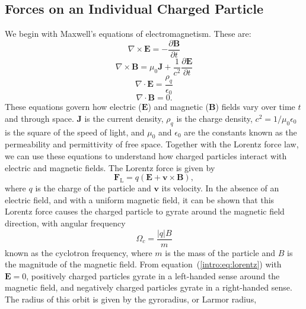 \subsection{Forces on an Individual Charged Particle}\label{intro:sec:singleparticle}
We begin with Maxwell's equations of electromagnetism. These are:
\begin{equation}
\nabla \times \boldsymbol{E} = -\frac{\partial \boldsymbol{B}}{\partial t}
\end{equation}
\begin{equation}\label{intro:eq:amperemaxwell}
\nabla \times \boldsymbol{B} = \mu_0 \boldsymbol{J} + \frac{1}{c^2}\frac{\partial \boldsymbol{E}}{\partial t}
\end{equation}
\begin{equation}
\nabla \cdot \boldsymbol{E} = \frac{\rho_q}{\epsilon_0} 
\end{equation}
\begin{equation}\label{intro:eq:nomonopoles}
\nabla \cdot \boldsymbol{B} = 0.
\end{equation}
These equations govern how electric ($\boldsymbol{E}$) and magnetic ($\boldsymbol{B}$) fields vary over time $t$ and through space. $\boldsymbol{J}$ is the current density, $\rho_q$ is the charge density, $c^2 = 1/\mu_0 \epsilon_0$ is the square of the speed of light, and $\mu_0$ and $\epsilon_0$ are the constants known as the permeability and permittivity of free space. Together with the Lorentz force law, we can use these equations to understand how charged particles interact with electric and magnetic fields. The Lorentz force is given by 
\begin{equation}\label{intro:eq:lorentz}
\boldsymbol{F}_\mathrm{L} = q(\boldsymbol{E} + \boldsymbol{v} \times \boldsymbol{B}),
\end{equation}
where $q$ is the charge of the particle and $\boldsymbol{v}$ its velocity. In the absence of an electric field, and with a uniform magnetic field, it can be shown that this Lorentz force causes the charged particle to gyrate around the magnetic field direction, with angular frequency
\begin{equation}
\Omega_c = \frac{|q|B}{m}
\end{equation}
known as the cyclotron frequency, where $m$ is the mass of the particle and $B$ is the magnitude of the magnetic field. From equation~(\ref{intro:eq:lorentz}) with $\boldsymbol{E}=0$, positively charged particles gyrate in a left-handed sense around the magnetic field, and negatively charged particles gyrate in a right-handed sense. The radius of this orbit is given by the gyroradius, or Larmor radius,
